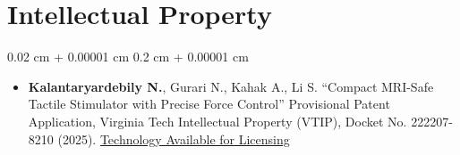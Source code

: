 \documentclass[10pt, letterpaper]{article}
\newenvironment{highlights}{
    \begin{itemize}[
        topsep=0.10 cm,
        parsep=0.10 cm,
        partopsep=0pt,
        itemsep=0pt,
        leftmargin=0.2 cm + 10pt
    ]
}{
    \end{itemize}
} %
\newenvironment{onecolentry}{
    \begin{adjustwidth}{
        0.02 cm + 0.00001 cm
    }{
        0.2 cm + 0.00001 cm
    }
}{
    \end{adjustwidth}
} %
\let\hrefWithoutArrow\href
\renewcommand{\href}[2]{\hrefWithoutArrow{#1}{#2}}
\begin{document}
\vspace{-.6em}
\section{Intellectual Property}
\begin{onecolentry}
\begin{highlights}


    \item \textbf{Kalantaryardebily N.}, Gurari N., Kahak A., Li S.
“Compact MRI-Safe Tactile Stimulator with Precise Force Control”
Provisional Patent Application, Virginia Tech Intellectual Property (VTIP), Docket No. 222207-8210 (2025). 
\href{https://vtip.technologypublisher.com/technology/61586}{Technology Available for Licensing}
    



    

\end{highlights}
\end{onecolentry}

\vspace{-.8em}
\end{document}
